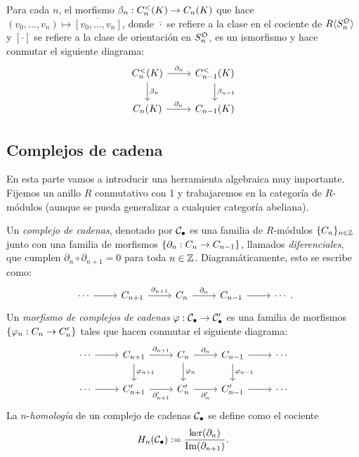 \documentclass[../../topologia_algebraica]{subfiles}
\begin{document}
\begin{prop}\label{prop:complejos_ordenados_inducen_mismo_complejo}
	Para cada $n$, el morfismo $\beta_n:C^<_n(K)\rightarrow C_n(K)$ que hace $(v_0,\ldots,v_n)\mapsto\overline{[v_0,\ldots,v_n]}$,
	donde $\overline{\cdot}$ se refiere a la clase en el cociente de $R\langle S_n^{\mathfrak{O}} \rangle$ y $[\cdot]$ se refiere a la clase de
	orientaci\'on en $S_n^{\mathfrak{O}}$, es un ismorfismo y hace conmutar el siguiente diagrama:
	\[
		\begin{tikzcd}
			C_n^<(K) \arrow[r,"\partial_n"] \arrow[d,"\beta_n"] & C_{n-1}^<(K) \arrow[d,"\beta_{n-1}"] \\
			C_n(K) \arrow[r,"\partial_n"] & C_{n-1}(K)
		\end{tikzcd}
	\]
\end{prop}

\subsection{Complejos de cadena}%

En esta parte vamos a introducir una herramienta algebraica muy importante. Fijemos un anillo
$R$ conmutativo con 1 y trabajaremos en la categor\'ia de $R$-m\'odulos (aunque se pueda generalizar
a cualquier categor\'ia abeliana).

\begin{defin}
	Un \emph{complejo de cadenas}, denotado por $\mathcal{C}_{\bullet}$ es una familia de $R$-m\'odulos $\{C_n\}_{n\in\mathbb{Z}}$
	junto con una familia de morfismos $\{\partial_n:C_n\rightarrow C_{n-1}\}$, llamados \emph{diferenciales}, que cumplen
	$\partial_n\circ\partial_{n+1}=0$ para toda $n\in\mathbb{Z}$. Diagram\'aticamente, esto se escribe como:
	\[
		\begin{tikzcd}
			\cdots \arrow[r] & C_{n+1} \arrow[r,"\partial_{n+1}"] & C_n \arrow[r,"\partial_n"] & C_{n-1} \arrow[r] & \cdots
		\end{tikzcd}.
	\]
	Un \emph{morfismo de complejos de cadenas} $\varphi:\mathcal{C}_{\bullet}\rightarrow\mathcal{C}'_{\bullet}$ es una familia de morfismos
	$\{\varphi_n:C_n\rightarrow C'_n\}$ tales que hacen conmutar el siguiente diagrama:
	\[
		\begin{tikzcd}
			\cdots \arrow[r] & C_{n+1} \arrow[r,"\partial_{n+1}"] \arrow[d,"\varphi_{n+1}"]& %
			C_n \arrow[r,"\partial_n"]  \arrow[d,"\varphi_{n}"]& C_{n-1}  \arrow[d,"\varphi_{n-1}"] \arrow[r] & \cdots \\
			\cdots \arrow[r] & C'_{n+1} \arrow[r,"\partial'_{n+1}"'] & C'_n \arrow[r,"\partial'_n"'] & C'_{n-1} \arrow[r] & \cdots
		\end{tikzcd}
	\]
	La $n$-\emph{homolog\'ia} de un complejo de cadenas $\mathcal{C}_{\bullet}$ se define como el cociente
	\[
		H_n(\mathcal{C}_{\bullet}):=\frac{\ker(\partial_n)}{\text{Im}(\partial_{n+1})}.
	\]
\end{defin}
\end{document}
